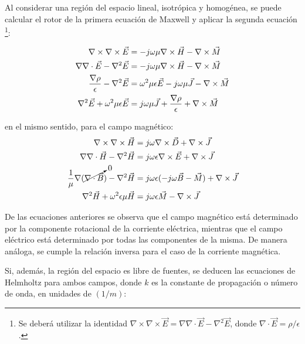Al considerar una región del espacio lineal, isotrópica y homogénea, se puede calcular el rotor de la primera ecuación de Maxwell y aplicar la segunda ecuación \footnote{Se deberá utilizar la identidad $\nabla \times \nabla \times \vec{E} = \nabla \nabla \cdot \vec{E} - \nabla^2\vec{E}$, donde $\nabla \cdot \vec{E} = \rho/\epsilon$.}:

\begin{align}
	\nabla \times \nabla \times \vec{E} & = -j \omega \mu \nabla \times \vec{H} - \nabla \times \vec{M} \notag \\
	\nabla \nabla \cdot \vec{E} - \nabla^2 \vec{E} & = -j \omega \mu \nabla \times \vec{H} - \nabla \times \vec{M} \notag \\
	\frac{\nabla \rho}{\epsilon} - \nabla^2 \vec{E} & = \omega^2 \mu \epsilon \vec{E} - j \omega \mu \vec{J} - \nabla \times \vec{M} \notag\\
	\nabla^2 \vec{E} + \omega^2 \mu \epsilon \vec{E} & = j \omega \mu \vec{J} + \frac{\nabla \rho}{\epsilon} + \nabla \times \vec{M}
	\label{eq:eq_ondas_completa_E}
\end{align}

en el mismo sentido, para el campo magnético:
\begin{align}
	\nabla \times \nabla \times \vec{H} & = j \omega \nabla \times \vec{D} +  \nabla \times \vec{J} \notag \\
	\nabla \nabla \cdot \vec{H} - \nabla^2 \vec{H} & = j \omega \epsilon \nabla \times \vec{E} + \nabla \times \vec{J} \notag \\
	\frac{1}{\mu} \nabla (\cancelto{0}{\nabla \cdot \vec{B}}) - \nabla^2 \vec{H} & = j \omega \epsilon (-j \omega \vec{B} - \vec{M}) + \nabla \times \vec{J} \notag \\
	\nabla^2 \vec{H} + \omega^2 \epsilon \mu \vec{H} & =  j \omega \epsilon \vec{M} - \nabla \times \vec{J}
	\label{eq:eq_ondas_completa_H}
\end{align}

De las ecuaciones anteriores se observa que el campo magnético está determinado por la componente rotacional de la corriente eléctrica, mientras que el campo eléctrico está determinado por todas las componentes de la misma. De manera análoga, se cumple la relación inversa para el caso de la corriente magnética.

Si, además, la región del espacio es libre de fuentes, se deducen las ecuaciones de Helmholtz para ambos campos, donde $k$ es la constante de propagación o número de onda, en unidades de $(1/m)$:

